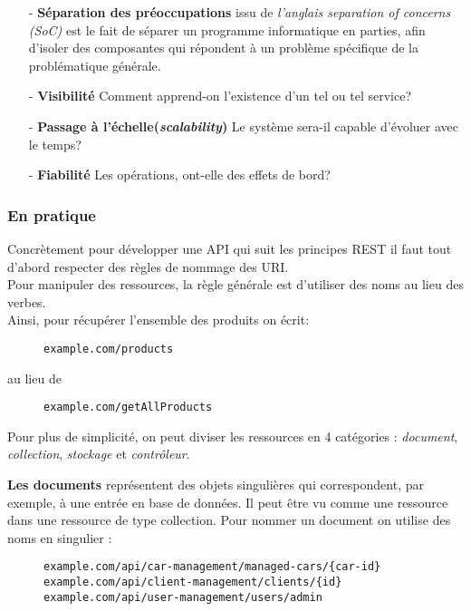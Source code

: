 \begin{itemize}
	\item [- \textbf{Séparation des préoccupations}] issu de \emph{l’anglais separation of concerns (SoC)} est le fait de séparer un programme informatique en parties, afin d'isoler des composantes qui répondent à un problème spécifique de la problématique générale.  
	\item [- \textbf{Visibilité}] Comment apprend-on l'existence d'un tel ou tel service? 
	\item [- \textbf{Passage à l'échelle(\emph{scalability})}] Le système sera-il capable d'évoluer avec le temps?
	\item [- \textbf{Fiabilité}] Les opérations, ont-elle des effets de bord?
\end{itemize}


\subsubsection{En pratique}
Concrètement pour développer une API qui suit les principes REST il faut tout d'abord respecter des règles de nommage des URI. \\
Pour manipuler des ressources, la règle générale est d'utiliser des noms au lieu des verbes.\\
Ainsi, pour récupérer l'ensemble des produits on écrit:
\begin{figure}[h!]
	\begin{lstlisting}[frame=single]
example.com/products
	\end{lstlisting}
\end{figure}

au lieu de 


\begin{figure}[h!]
	\begin{lstlisting}[frame=single]
example.com/getAllProducts
	\end{lstlisting}
\end{figure}
 
Pour plus de simplicité, on peut diviser les ressources en 4 catégories : \emph{document}, \emph{collection}, \emph{stockage} et \emph{contrôleur}. 

\textbf{Les documents} représentent des objets singulières qui  correspondent, par exemple, à une entrée en base de données. Il peut être vu comme une ressource dans une ressource de type collection. Pour nommer un document on utilise des noms en singulier : 
\begin{figure}[h!]
	\begin{lstlisting}[frame=single]
example.com/api/car-management/managed-cars/{car-id}
example.com/api/client-management/clients/{id}
example.com/api/user-management/users/admin
	\end{lstlisting}
\end{figure}

